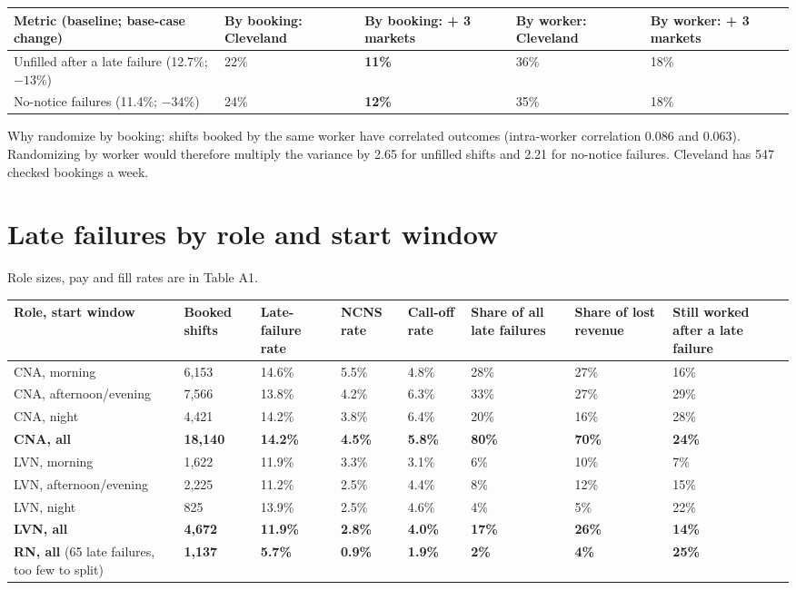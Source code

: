 \documentclass[11pt]{article}
\begin{document}
\begin{center}\small
{}
\begin{tabularx}{\textwidth}{@{}LR{1.9cm}R{1.9cm}R{1.9cm}R{1.9cm}@{}}
\toprule
Metric (baseline; base-case change) & By booking: Cleveland & By booking: + 3 markets & By worker: Cleveland & By
worker: + 3 markets \\
\midrule
Unfilled after a late failure (12.7\%; $-13\%$) & 22\% & \textbf{11\%} & 36\% & 18\% \\
No-notice failures (11.4\%; $-34\%$) & 24\% & \textbf{12\%} & 35\% & 18\% \\
\bottomrule
\end{tabularx}
\end{center}

Why randomize by booking: shifts booked by the same worker have correlated outcomes (intra-worker correlation 0.086 and
0.063). Randomizing by worker would therefore multiply the variance by 2.65 for unfilled shifts and 2.21 for no-notice
failures. Cleveland has 547 checked bookings a week.

\section{Late failures by role and start window}
Role sizes, pay and fill rates are in Table A1.

\begin{center}\small
{}
\begin{tabularx}{\textwidth}{@{}LR{1.3cm}R{1.3cm}R{1.1cm}R{1.2cm}R{1.5cm}R{1.4cm}R{1.6cm}@{}}
\toprule
Role, start window & Booked shifts & Late-failure rate & NCNS rate & Call-off rate & Share of all late failures & Share of
lost revenue & Still worked after a late failure \\
\midrule
CNA, morning & 6,153 & 14.6\% & 5.5\% & 4.8\% & 28\% & 27\% & 16\% \\
CNA, afternoon/evening & 7,566 & 13.8\% & 4.2\% & 6.3\% & 33\% & 27\% & 29\% \\
CNA, night & 4,421 & 14.2\% & 3.8\% & 6.4\% & 20\% & 16\% & 28\% \\
\textbf{CNA, all} & \textbf{18,140} & \textbf{14.2\%} & \textbf{4.5\%} & \textbf{5.8\%} & \textbf{80\%} & \textbf{70\%} &
\textbf{24\%} \\
LVN, morning & 1,622 & 11.9\% & 3.3\% & 3.1\% & 6\% & 10\% & 7\% \\
LVN, afternoon/evening & 2,225 & 11.2\% & 2.5\% & 4.4\% & 8\% & 12\% & 15\% \\
LVN, night & 825 & 13.9\% & 2.5\% & 4.6\% & 4\% & 5\% & 22\% \\
\textbf{LVN, all} & \textbf{4,672} & \textbf{11.9\%} & \textbf{2.8\%} & \textbf{4.0\%} & \textbf{17\%} & \textbf{26\%} &
\textbf{14\%} \\
\textbf{RN, all} (65 late failures, too few to split) & \textbf{1,137} & \textbf{5.7\%} & \textbf{0.9\%} & \textbf{1.9\%}
& \textbf{2\%} & \textbf{4\%} & \textbf{25\%} \\
\bottomrule
\end{tabularx}
\end{center}
\end{document}
